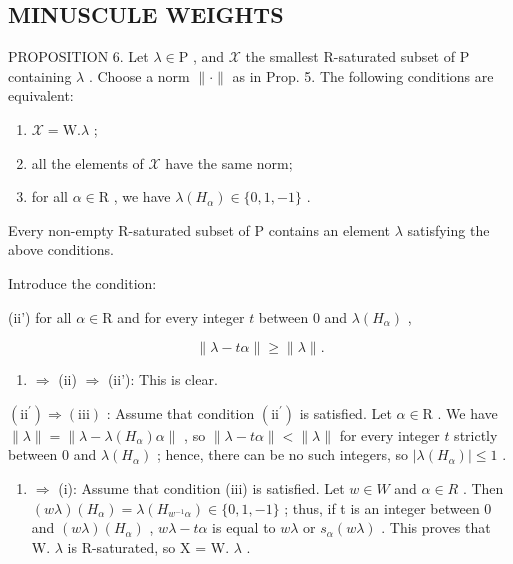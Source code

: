\subsection{MINUSCULE WEIGHTS}

PROPOSITION 6. Let \(\lambda \in \mathrm{P}\) , and \(\mathcal{X}\) the smallest R-saturated subset of P containing \(\lambda\) . Choose a norm \(\| \cdot \|\) as in Prop. 5. The following conditions are equivalent:

\begin{enumerate}
\def\labelenumi{(\roman{enumi})}
\item
  \(\mathcal{X} = \mathrm{W}.\lambda\) ;
\item
  all the elements of \(\mathcal{X}\) have the same norm;
\item
  for all \(\alpha \in \mathrm{R}\) , we have \(\lambda(H_{\alpha}) \in \{0,1,-1\}\) .
\end{enumerate}

Every non-empty R-saturated subset of P contains an element \(\lambda\) satisfying the above conditions.

Introduce the condition:

(ii') for all \(\alpha \in \mathrm{R}\) and for every integer \(t\) between 0 and \(\lambda(H_{\alpha})\) ,

\[
\| \lambda - t \alpha \| \geq \| \lambda \|.
\]

\begin{enumerate}
\def\labelenumi{(\roman{enumi})}
\tightlist
\item
  \(\Longrightarrow\) (ii) \(\Longrightarrow\) (ii'): This is clear.
\end{enumerate}

\((\mathrm{ii}^{\prime}) \Longrightarrow (\mathrm{iii})\) : Assume that condition \((\mathrm{ii}^{\prime})\) is satisfied. Let \(\alpha \in \mathrm{R}\) . We have \(\| \lambda \| = \| \lambda - \lambda (H_{\alpha})\alpha \|\) , so \(\| \lambda - t\alpha \| < \| \lambda \|\) for every integer \(t\) strictly between 0 and \(\lambda (H_{\alpha})\) ; hence, there can be no such integers, so \(|\lambda (H_{\alpha})| \leq 1\) .

\begin{enumerate}
\def\labelenumi{(\roman{enumi})}
\setcounter{enumi}{2}
\tightlist
\item
  \(\Longrightarrow\) (i): Assume that condition (iii) is satisfied. Let \(w \in W\) and \(\alpha \in R\) . Then \((w\lambda)(H_{\alpha}) = \lambda(H_{w^{-1}\alpha}) \in \{0,1,-1\}\) ; thus, if t is an integer between 0 and \((w\lambda)(H_{\alpha})\) , \(w\lambda - t\alpha\) is equal to \(w\lambda\) or \(s_{\alpha}(w\lambda)\) . This proves that W. \(\lambda\) is R-saturated, so X = W. \(\lambda\) .
\end{enumerate}


